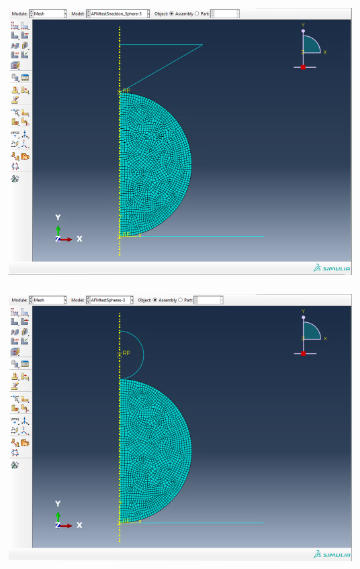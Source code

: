 \begin{figure}[H]
\centering

    \begin{subfigure}{0.3\textwidth}
        \centering
        \caption{\label{fig: Cone-Sphere-ABAQUS-setup}}
        \includegraphics[width=1\linewidth]{Figures/Cone-Sphere-ABAQUS-setup.png}
    \end{subfigure}
    \hfill     
    \begin{subfigure}{0.3\textwidth}
        \centering
        \caption{\label{fig: Sphere-Sphere-ABAQUS-setup}}
        \includegraphics[width=1\linewidth]{Figures/Sphere-Sphere-ABAQUS-setup.png}
    \end{subfigure}

\end{figure}
